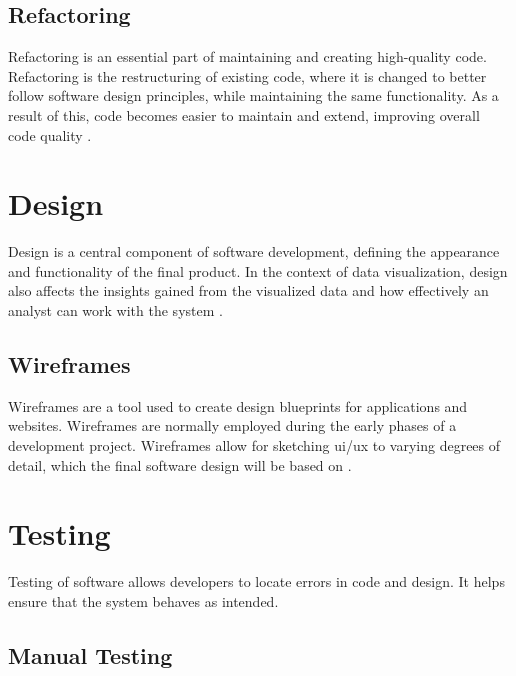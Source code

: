 \subsection{Refactoring}
\label{sec:refactoring_theory}

Refactoring is an essential part of maintaining and creating high-quality code. Refactoring is the restructuring of existing code, where it is changed to better follow software design principles, while maintaining the same functionality. As a result of this, code becomes easier to maintain and extend, improving overall code quality \parencite{refactoring}.


\section{Design}
\label{sec:design_theory}

Design is a central component of software development, defining the appearance and functionality of the final product. In the context of data visualization, design also affects the insights gained from the visualized data and how effectively an analyst can work with the system \parencite{nngroup_usability,appnovation_data_visualization_principles}.


\subsection{Wireframes}
\label{sec:wireframes_theory}

Wireframes are a tool used to create design blueprints for applications and websites. Wireframes are normally employed during the early phases of a development project. Wireframes allow for sketching \acrshort{ui}/\acrshort{ux} to varying degrees of detail, which the final software design will be based on \parencite{ixdf_wireframes,figma_wireframes}.

\section{Testing}
\label{sec:testing_theory}

Testing of software allows developers to locate errors in code and design. It helps ensure that the system behaves as intended.

\subsection{Manual Testing}
\label{sec:manual_testing_theory}


